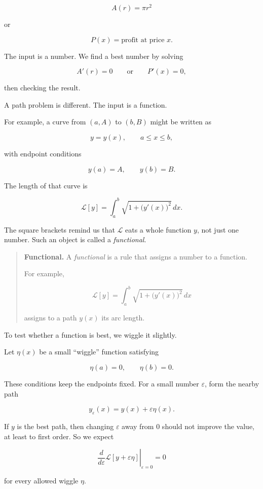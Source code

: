 \[
A(r)=\pi r^2
\]

or

\[
P(x)=\text{profit at price }x.
\]

The input is a number.  We find a best number by solving

\[
A'(r)=0
\qquad\text{or}\qquad
P'(x)=0,
\]

then checking the result.

A path problem is different.  The input is a function.

For example, a curve from \((a,A)\) to \((b,B)\) might be written as

\[
y=y(x),
\qquad
a\le x\le b,
\]

with endpoint conditions

\[
y(a)=A,
\qquad
y(b)=B.
\]

The length of that curve is

\[
\mathcal{L}[y]
=
\int_a^b \sqrt{1+\bigl(y'(x)\bigr)^2}\,dx.
\]

The square brackets remind us that \(\mathcal{L}\) eats a whole function \(y\), not just
one number.  Such an object is called a \emph{functional}.

\begin{quote}
\textbf{Functional.}
A \emph{functional} is a rule that assigns a number to a function.

For example,

\[
\mathcal{L}[y]
=
\int_a^b \sqrt{1+\bigl(y'(x)\bigr)^2}\,dx
\]

assigns to a path \(y(x)\) its arc length.
\end{quote}

To test whether a function is best, we wiggle it slightly.

Let \(\eta(x)\) be a small ``wiggle'' function satisfying

\[
\eta(a)=0,
\qquad
\eta(b)=0.
\]

These conditions keep the endpoints fixed.  For a small number \(\varepsilon\), form the
nearby path

\[
y_\varepsilon(x)=y(x)+\varepsilon\eta(x).
\]

If \(y\) is the best path, then changing \(\varepsilon\) away from \(0\) should not improve
the value, at least to first order.  So we expect

\[
\left.\frac{d}{d\varepsilon}\mathcal{L}[y+\varepsilon\eta]\right|_{\varepsilon=0}=0
\]

for every allowed wiggle \(\eta\).

